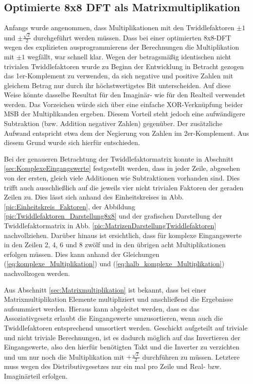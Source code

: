 \subsection{Optimierte 8x8 DFT als Matrixmultiplikation}\label{sec:OptimierteMatrixmultiplikation}
Anfangs wurde angenommen, dass Multiplikationen mit den Twiddlefaktoren $\pm 1$ und $\pm\frac{\sqrt{2}}{2}$ durchgeführt werden müssen. 
Dass bei einer optimierten 8x8-DFT wegen des explizieten ausprogrammierens der Berechnungen die Multiplikation mit $\pm1$ wegfällt, war schnell klar.
Wegen der betragsmäßig identischen nicht trivialen Twiddlefaktoren wurde zu Beginn der Entwicklung in Betracht gezogen das 1er-Komplement zu verwenden, da sich negative und positive Zahlen mit gleichem Betrag nur durch ihr höchstwertigstes 
Bit unterscheiden. Auf diese Weise könnte dasselbe Resultat für den Imaginär- wie für den Realteil verwendet werden. Das Vorzeichen würde sich über eine 
einfache XOR-Verknüpfung beider MSB der Multiplikanden ergeben.
Diesem Vorteil steht jedoch eine aufwändigere Subtraktion (bzw. Addition negativer Zahlen) gegenüber. Der zusätzliche Aufwand entspricht 
etwa dem der Negierung von Zahlen im 2er-Komplement. Aus diesem Grund wurde sich hierfür entschieden.

Bei der genaueren Betrachtung der Twiddlefaktormatrix konnte in Abschnitt \ref{sec:KomplexeEingangswerte} festgestellt werden, dass in jeder Zeile, abgesehen von der ersten, gleich viele Additionen wie Subtraktionen vorhanden sind. Dies trifft auch ausschließlich auf die jeweils vier nicht trivialen Faktoren der geraden Zeilen zu. 
Dies lässt sich anhand des Einheitskreises in Abb. \ref{pic:Einheitskreis_Faktoren}, der Abbildung \ref{pic:Twiddlefaktoren_Darstellung8x8}
 und der grafischen Darstellung der Twiddlefaktormatrix in Abb. \ref{pic:MatrizenDarstellungTwiddlefaktoren} nachvollziehen. 
 Darüber hinaus ist ersichtlich, dass für komplexe Eingangswerte in den Zeilen 2, 4, 6 und 8 zwölf und in den übrigen acht Multiplikationen erfolgen müssen. Dies kann anhand der 
 Gleichungen (\ref{eq:komplexe_Multiplikation}) und (\ref{eq:halb_komplexe_Multiplikation}) nachvollzogen werden.
 
Aus Abschnitt \ref{sec:Matrixmultiplikation} ist bekannt, dass bei einer Matrixmultiplikation Elemente multipliziert und anschließend die Ergebnisse 
 aufsummiert werden.
 Hieraus kann abgeleitet werden, dass es das Assoziativgesetz erlaubt die Eingangswerte umzusortieren, wenn auch die Twiddlefaktoren entsprechend umsortiert werden. 
Geschickt aufgeteilt auf triviale und nicht triviale Berechnungen, 
ist es dadurch möglich auf das Invertieren der Eingangswerte, also den hierfür benötigten Takt und die Inverter zu verzichten und um nur noch die Multiplikation
mit $+\frac{\sqrt{2}}{2}$ durchführen zu müssen. Letztere muss wegen des Distributivgesetzes nur ein mal pro Zeile und Real- bzw. Imaginärteil erfolgen.

